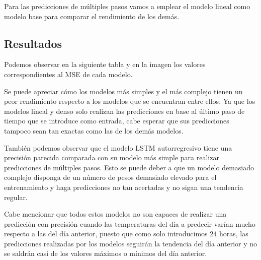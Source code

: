 Para las predicciones de múltiples pasos vamos a emplear el modelo lineal como modelo base para comparar el rendimiento de los demás.

\subsection{Resultados}

Podemos observar en la siguiente tabla y en la imagen los valores correspondientes al MSE de cada modelo.



Se puede apreciar cómo los modelos más simples y el más complejo tienen un peor rendimiento respecto a los modelos que se encuentran entre ellos. Ya que los modelos lineal y denso solo realizan las predicciones en base al último paso de tiempo que se introduce como entrada, cabe esperar que sus predicciones tampoco sean tan exactas como las de los demás modelos.

\par

También podemos observar que el modelo LSTM autorregresivo tiene una precisión parecida comparada con su modelo más simple para realizar predicciones de múltiples pasos. Esto se puede deber a que un modelo demasiado complejo disponga de un número de pesos demasiado elevado para el entrenamiento y haga predicciones no tan acertadas y no sigan una tendencia regular.

\par

Cabe mencionar que todos estos modelos no son capaces de realizar una predicción con precisión cuando las temperaturas del día a predecir varían mucho respecto a las del día anterior, puesto que como solo introducimos 24 horas, las predicciones realizadas por los modelos seguirán la tendencia del día anterior y no se saldrán casi de los valores máximos o mínimos del día anterior.